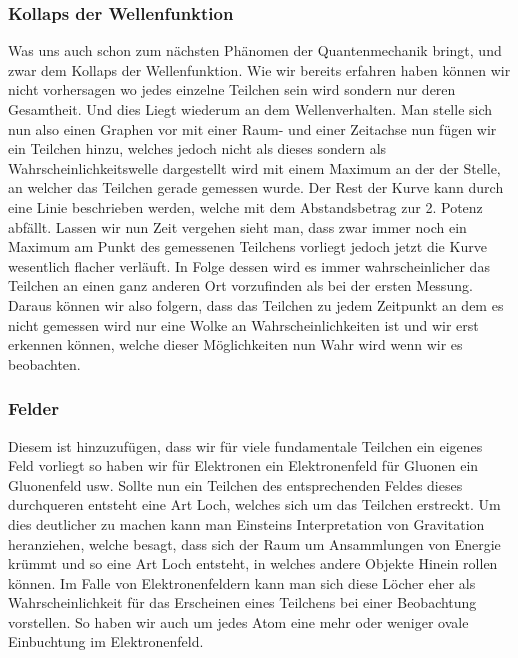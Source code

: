 \documentclass[12pt]{report}
\begin{document}
\subsubsection{Kollaps der Wellenfunktion}
Was uns auch schon zum nächsten Phänomen der Quantenmechanik bringt, und zwar dem Kollaps der Wellenfunktion. Wie wir bereits erfahren haben können wir nicht vorhersagen wo jedes einzelne Teilchen sein wird sondern nur deren Gesamtheit. Und dies Liegt wiederum an dem Wellenverhalten. Man stelle sich nun also einen Graphen vor mit einer Raum- und einer Zeitachse nun fügen wir ein Teilchen hinzu, welches jedoch nicht als dieses sondern als Wahrscheinlichkeitswelle dargestellt wird mit einem Maximum an der der Stelle, an welcher das Teilchen gerade gemessen wurde. Der Rest der Kurve kann durch eine Linie beschrieben werden, welche mit dem Abstandsbetrag zur 2. Potenz abfällt. Lassen wir nun Zeit vergehen sieht man, dass zwar immer noch ein Maximum am Punkt des gemessenen Teilchens vorliegt jedoch jetzt die Kurve wesentlich flacher verläuft. In Folge dessen wird es immer wahrscheinlicher das Teilchen an einen ganz anderen Ort vorzufinden als bei der ersten Messung. Daraus können wir also folgern, dass das Teilchen zu jedem Zeitpunkt an dem es nicht gemessen wird nur eine Wolke an Wahrscheinlichkeiten ist und wir erst erkennen können, welche dieser Möglichkeiten nun Wahr wird wenn wir es beobachten.

\subsubsection{Felder} 
Diesem ist hinzuzufügen, dass wir für viele fundamentale Teilchen ein eigenes Feld vorliegt so haben wir für Elektronen ein Elektronenfeld für Gluonen ein Gluonenfeld usw. Sollte nun ein Teilchen des entsprechenden Feldes dieses durchqueren entsteht eine Art Loch, welches sich um das Teilchen erstreckt. Um dies deutlicher zu machen kann man Einsteins Interpretation von Gravitation heranziehen, welche besagt, dass sich der Raum um Ansammlungen von Energie krümmt und so eine Art Loch entsteht, in welches andere Objekte Hinein rollen können. Im Falle von Elektronenfeldern kann man sich diese Löcher eher als Wahrscheinlichkeit für das Erscheinen eines Teilchens bei einer Beobachtung vorstellen. So haben wir auch um jedes Atom eine mehr oder weniger ovale Einbuchtung  im Elektronenfeld. 
\newpage
\end{document}
